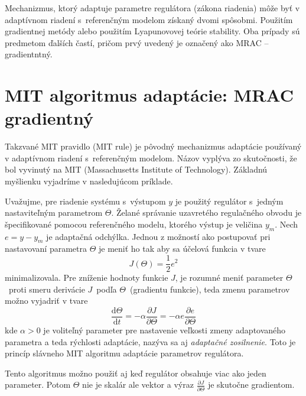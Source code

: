 \documentclass[a4paper, 10pt, ]{article}
\begin{document}
Mechanizmus, ktorý adaptuje parametre regulátora (zákona riadenia) môže byť v adaptívnom riadení s~referenčným modelom získaný dvomi spôsobmi. Použitím gradientnej metódy alebo použitím Lyapunovovej teórie stability. Oba prípady sú predmetom ďalších častí, pričom prvý uvedený je označený ako MRAC -- gradientntný.









\section{MIT algoritmus adaptácie: MRAC gradientný}



Takzvané MIT pravidlo (MIT rule) je pôvodný mechanizmus adaptácie používaný v adaptívnom riadení s~referenčným modelom. Názov vyplýva zo skutočnosti, že bol vyvinutý na MIT (Massachusetts Institute of Technology). Základnú myšlienku vyjadríme v nasledujúcom príklade.

Uvažujme, pre riadenie systému s~výstupom $y$ je použitý regulátor s~jedným nastaviteľným parametrom $\Theta$. Želané správanie uzavretého regulačného obvodu je špecifikované pomocou referenčného modelu, ktorého výstup je veličina $y_m$. Nech $e = y - y_m$ je adaptačná odchýlka. Jednou z možností ako postupovať pri nastavovaní parametra $\Theta$ je meniť ho tak aby sa účelová funkcia v tvare
\begin{equation}
	J(\Theta) = \frac{1}{2} e^2
\end{equation}
minimalizovala. Pre zníženie hodnoty funkcie $J$, je rozumné meniť parameter $\Theta$~proti smeru derivácie $J$~podľa $\Theta$~(gradientu funkcie), teda zmenu parametrov možno vyjadriť v tvare
\begin{equation}
	\frac{\text{d}\Theta}{\text{d}t} = - \alpha \frac{\partial J}{\partial \Theta} = - \alpha e \frac{\partial e}{\partial \Theta}
\end{equation}
kde $\alpha > 0$ je voliteľný parameter pre nastavenie veľkosti zmeny adaptovaného parametra a teda rýchlosti adaptácie, nazýva sa aj \emph{adaptačné zosilnenie}. Toto je princíp slávneho MIT algoritmu adaptácie parametrov regulátora.

Tento algoritmus možno použiť aj keď regulátor obsahuje viac ako jeden parameter. Potom $\Theta$ nie je skalár ale vektor a výraz $\frac{\partial J}{\partial \Theta}$ je skutočne gradientom.
\end{document}
